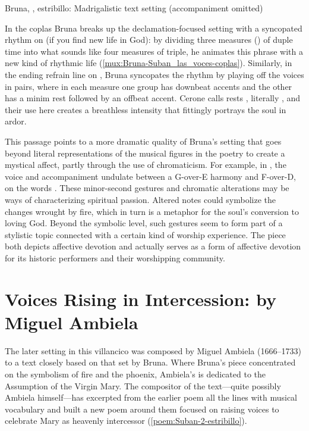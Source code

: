 
{Bruna, , estribillo: Madrigalistic text setting
(accompaniment omitted)}

In the coplas Bruna breaks up the declamation-focused setting with a syncopated
rhythm on  (if you find new life in God):
by dividing three measures () of duple time into what sounds
like four measures of triple, he animates this phrase with a new kind of
rhythmic life (\cref{mux:Bruna-Suban_las_voces-coplas}).
Similarly, in the ending refrain line on , Bruna syncopates the
rhythm by playing off the voices in pairs, where in each measure one group has
downbeat accents and the other has a minim rest followed by an offbeat accent.
Cerone calls rests , literally , and their use
here creates a breathless intensity that fittingly portrays the soul in ardor.%
    \citXXX[Cerone]

This passage points to a more dramatic quality of Bruna's setting that goes
beyond literal representations of the musical figures in the poetry to create a
mystical affect, partly through the use of chromaticism.
For example, in , the voice and accompaniment undulate between a
G-over-E\fl{} harmony and F\sh-over-D, on the words .
These minor-second gestures and chromatic alterations may be
ways of characterizing spiritual passion.
Altered notes could symbolize the changes wrought by fire, which in turn is a
metaphor for the soul's conversion to loving God.  
Beyond the symbolic level, such gestures seem to form part of a stylistic topic
connected with a certain kind of worship experience.  
The piece both depicts affective devotion and actually serves as a form of
affective devotion for its historic performers and their worshipping community.



\section{Voices Rising in Intercession: 
 by Miguel Ambiela}

The later setting in this villancico was composed by Miguel Ambiela
(1666--1733) to a text closely based on that set by Bruna.
Where Bruna's piece concentrated on the symbolism of fire and the phoenix,
Ambiela's is dedicated to the Assumption of the Virgin Mary.
The compositor of the text---quite possibly Ambiela himself---has excerpted
from the earlier poem all the lines with musical vocabulary and built a new
poem around them focused on raising voices to celebrate Mary as heavenly
intercessor (\cref{poem:Suban-2-estribillo}).

